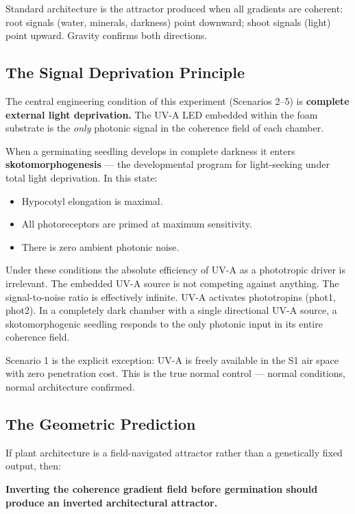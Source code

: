 \documentclass[10pt, a4paper]{article}
\begin{document}
Standard architecture is the attractor produced when all
gradients are coherent: root signals (water, minerals,
darkness) point downward; shoot signals (light) point upward.
Gravity confirms both directions.

\subsection{The Signal Deprivation Principle}

The central engineering condition of this experiment
(Scenarios 2--5) is \textbf{complete external light
deprivation.} The UV-A LED embedded within the foam
substrate is the \textit{only} photonic signal in the
coherence field of each chamber.

When a germinating seedling develops in complete darkness
it enters \textbf{skotomorphogenesis} --- the developmental
program for light-seeking under total light deprivation.
In this state:
\begin{itemize}[itemsep=0.1em]
  \item Hypocotyl elongation is maximal.
  \item All photoreceptors are primed at maximum sensitivity.
  \item There is zero ambient photonic noise.
\end{itemize}

Under these conditions the absolute efficiency of UV-A as
a phototropic driver is irrelevant. The embedded UV-A
source is not competing against anything.
The signal-to-noise ratio is effectively infinite.
UV-A activates phototropins (phot1, phot2).
In a completely dark chamber with a single directional
UV-A source, a skotomorphogenic seedling responds to the
only photonic input in its entire coherence field.

Scenario 1 is the explicit exception: UV-A is freely
available in the S1 air space with zero penetration cost.
This is the true normal control --- normal conditions,
normal architecture confirmed.

\subsection{The Geometric Prediction}

If plant architecture is a field-navigated attractor
rather than a genetically fixed output, then:

\textbf{Inverting the coherence gradient field before
germination should produce an inverted architectural attractor.}
\end{document}
